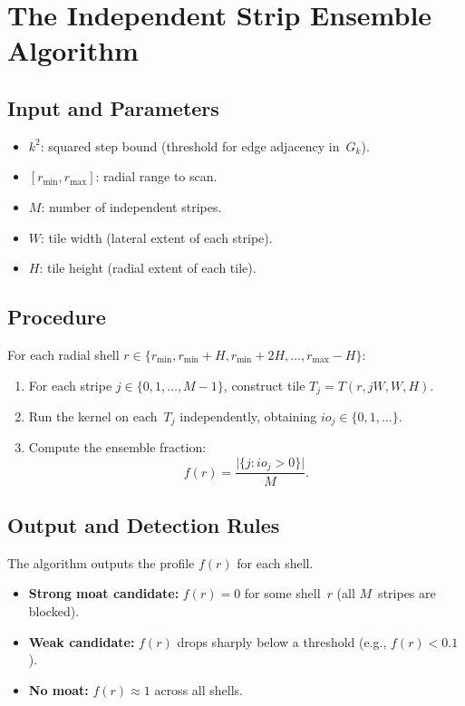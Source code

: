 \documentclass[11pt,a4paper]{article}
\theoremstyle{definition}
\theoremstyle{remark}
\begin{document}
\section{The Independent Strip Ensemble Algorithm}\label{sec:algo}

\subsection{Input and Parameters}

\begin{itemize}
  \item $k^2$: squared step bound (threshold for edge adjacency in~$G_k$).
  \item $[r_{\min}, r_{\max}]$: radial range to scan.
  \item $M$: number of independent stripes.
  \item $W$: tile width (lateral extent of each stripe).
  \item $H$: tile height (radial extent of each tile).
\end{itemize}

\subsection{Procedure}

For each radial shell $r \in \{r_{\min}, r_{\min}+H, r_{\min}+2H, \ldots, r_{\max}-H\}$:
\begin{enumerate}
  \item For each stripe $j \in \{0, 1, \ldots, M-1\}$, construct tile
    $T_j = T(r, jW, W, H)$.
  \item Run the kernel on each~$T_j$ independently, obtaining
    $\mathit{io}_j \in \{0, 1, \ldots\}$.
  \item Compute the ensemble fraction:
    \begin{equation}\label{eq:fR}
      f(r) = \frac{\bigl|\{j : \mathit{io}_j > 0\}\bigr|}{M}.
    \end{equation}
\end{enumerate}

\subsection{Output and Detection Rules}

The algorithm outputs the profile $f(r)$ for each shell.
\begin{itemize}
  \item \textbf{Strong moat candidate:} $f(r) = 0$ for some shell~$r$
    (all $M$~stripes are blocked).
  \item \textbf{Weak candidate:} $f(r)$ drops sharply below a
    threshold (e.g., $f(r) < 0.1$).
  \item \textbf{No moat:} $f(r) \approx 1$ across all shells.
\end{itemize}
\end{document}
